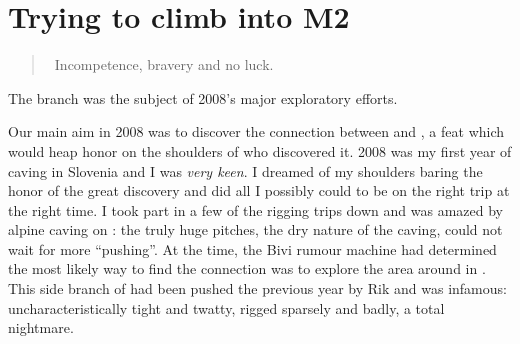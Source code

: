 \section{Trying to climb into M2}

\begin{quote} Incompetence, bravery and no luck. \end{quote}



\begin{marginsurvey}
\checkoddpage \ifoddpage \forcerectofloat \else \forceversofloat \fi
\centering
 \caption[2007 Captain Kangaroo Survey]{The \protect{} branch was the subject of 2008's major exploratory efforts.}
 \label{cptk pre2008 survey}
\end{marginsurvey}


Our main aim in 2008 was to discover the connection between 
and , a feat which would heap honor on the
shoulders of who discovered it. 2008 was my first year of caving in
Slovenia and I was \textit{very keen}. I dreamed of my shoulders baring
the honor of the great discovery and did all I possibly could to be on
the right trip at the right time. I took part in a few of the rigging
trips down  and was amazed by alpine caving on : the
truly huge pitches, the dry nature of the caving, could not wait for
more ``pushing''. At the time, the Bivi rumour machine had determined
the most likely way to find the connection was to explore the area
around  in . This side branch
of  had been pushed the previous year by Rik and was
infamous: uncharacteristically tight and twatty, rigged sparsely and
badly, a total nightmare.


